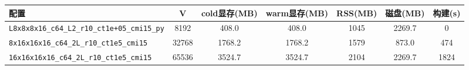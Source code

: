 \begin{tabular}{lcccccc}
\hline
配置 & V & cold显存(MB) & warm显存(MB) & RSS(MB) & 磁盘(MB) & 构建(s) \\
\hline
\texttt{L8x8x8x16\_c64\_L2\_r10\_ct1e+05\_cmi15\_py} & 8192 & 408.0 & 408.0 & 1045 & 2269.7 & 0 \\
\texttt{8x16x16x16\_c64\_2L\_r10\_ct1e5\_cmi15} & 32768 & 1768.2 & 1768.2 & 1579 & 873.0 & 474 \\
\texttt{16x16x16x16\_c64\_2L\_r10\_ct1e5\_cmi15} & 65536 & 3524.7 & 3524.7 & 2104 & 2269.7 & 1824 \\
\hline
\end{tabular}
